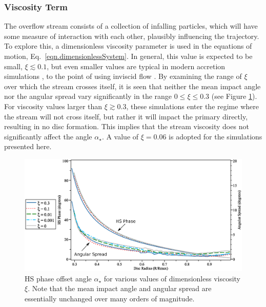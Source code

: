 \documentclass[preprint2]{aastex}
\newcommand{\note}[1]{[$\blacktriangleright$~\textbf{#1}~$\blacktriangleleft$]}
\begin{document}
\subsubsection{Viscosity Term}
The overflow stream consists of a collection of infalling particles, which will
have some measure of interaction with each other, plausibly
influencing the trajectory.  To explore this, a dimensionless
viscosity parameter is used in the equations of motion, Eq.\
\ref{eqn.dimensionlessSystem}.  In general, this value is expected to
be small, $\xi \lesssim 0.1$, but even smaller values are typical in
modern accretion simulations \citep{2008A&A...487..671K}, to the point
of using inviscid flow \citep{1992MNRAS.255P..17S}.  By examining the
range of $\xi$ over which the stream crosses itself, it is seen that
neither the mean impact angle nor the angular spread vary
significantly in the range $0 \le \xi \le 0.3$ (see Figure
\ref{fig.impact_angle_various}).  For viscosity values larger than
$\xi \gtrsim 0.3$, these simulations enter the regime where the stream
will not cross itself, but rather it will impact the primary directly,
resulting in no disc formation.  This implies that the stream
viscosity does not significantly affect the angle $\alpha_\star$.  A value
of $\xi = 0.06$ is adopted for the simulations presented here.

\begin{figure}[t!]
  \includegraphics[width=\textwidth]{./figs/impact_angle_various2.eps}
  \caption{HS phase offset angle $\alpha_\star$ for various values of
  dimensionless viscosity $\xi$.  Note that the mean impact angle and
  angular spread are essentially unchanged over many orders of
  magnitude. }
  \label{fig.impact_angle_various}
\end{figure}
\end{document}
